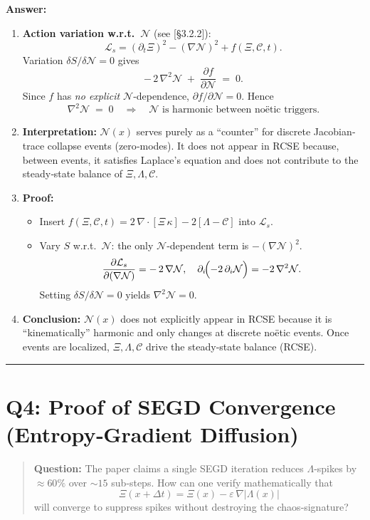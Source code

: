 \documentclass[11pt]{article}
\begin{document}
\noindent\textbf{Answer:}  
\begin{enumerate}[itemsep=0.5em]
  \item \textbf{Action variation w.r.t.\ $\mathcal N$} (see [§3.2.2]):  
    \[
      \mathcal L_s = (\partial_t\Xi)^2 - (\nabla\mathcal N)^2 + f(\Xi,\mathcal C,t).
    \]
    Variation $\delta S/\delta \mathcal N = 0$ gives
    \[
      -\,2\,\nabla^2\mathcal N \;+\; \frac{\partial f}{\partial\mathcal N} \;=\; 0.
    \]
    Since $f$ has \emph{no explicit} $\mathcal N$‐dependence, $\partial f/\partial\mathcal N=0$.  Hence
    \[
      \nabla^2\mathcal N \;=\; 0
      \quad\Longrightarrow\quad\mathcal N
      \text{ is harmonic between noëtic triggers.}
    \]
  \item \textbf{Interpretation:}  
    $\mathcal N(x)$ serves purely as a “counter” for discrete Jacobian‐trace collapse events (zero‐modes).  It does not appear in RCSE because, between events, it satisfies Laplace’s equation and does not contribute to the steady‐state balance of $\Xi,\Lambda,\mathcal C$.  
  \item \textbf{Proof:}  
    \begin{itemize}[itemsep=0.25em]
      \item Insert $f(\Xi,\mathcal C,t)=2\,\nabla\!\cdot[\Xi\,\kappa] - 2[\Lambda-\mathcal C]$ into $\mathcal L_s$.  
      \item Vary $S$ w.r.t.\ $\mathcal N$: the only $\mathcal N$‐dependent term is $-(\nabla\mathcal N)^2$.  
      \[
        \frac{\partial \mathcal L_s}{\partial(\nabla \mathcal N)}
        = -\,2\,\nabla \mathcal N,\quad
        \partial_i\!\Bigl(-2\,\partial_i\mathcal N\Bigr) = -2\,\nabla^2\mathcal N.
      \]
      Setting $\delta S/\delta \mathcal N=0$ yields $\nabla^2\mathcal N=0$.  
    \end{itemize}
  \item \textbf{Conclusion:}  
    $\mathcal N(x)$ does not explicitly appear in RCSE because it is “kinematically” harmonic and only changes at discrete noëtic events.  Once events are localized, $\Xi,\Lambda,\mathcal C$ drive the steady‐state balance (RCSE).  
\end{enumerate}

\vspace{1em}
\hrule

\section*{Q4: Proof of SEGD Convergence (Entropy‐Gradient Diffusion)}
\begin{quote}
\textbf{Question:} The paper claims a single SEGD iteration reduces $\Lambda$‐spikes by $\approx60\%$ over $\sim15$ sub‐steps. How can one verify mathematically that 
\[
  \Xi(x+\Delta t) = \Xi(x) - \varepsilon\,\nabla|\Lambda(x)|
\]
will converge to suppress spikes without destroying the chaos‐signature?
\end{quote}
\end{document}
